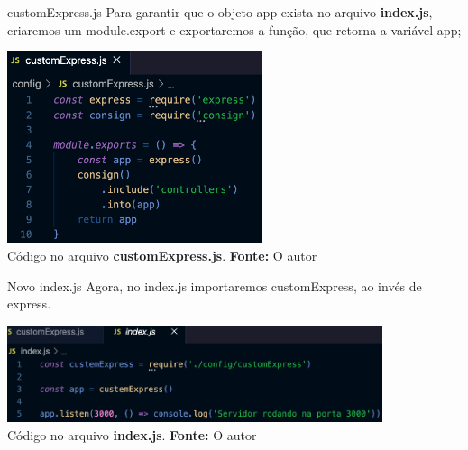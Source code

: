 \documentclass{beamer}
\begin{document}
    \begin{frame}{customExpress.js}
 	Para garantir que o objeto \alert{app} exista no arquivo \textbf{index.js}, criaremos um \alert{module.export} e exportaremos a função, que retorna a variável app; 
        
         \begin{center}
    	\includegraphics[width=75mm]{resources/aula4_10.png}\\
        \tiny{ Código no arquivo \textbf{customExpress.js}. \textbf{Fonte:} O autor}
     \end{center}   
    \end{frame}
    \begin{frame}{Novo index.js}
 	Agora, no index.js importaremos customExpress, ao invés de express.
        
         \begin{center}
    	\includegraphics[width=110mm]{resources/aula4_11.png}\\
        \tiny{ Código no arquivo \textbf{index.js}. \textbf{Fonte:} O autor}
     \end{center}   
    \end{frame}    
\end{document}
